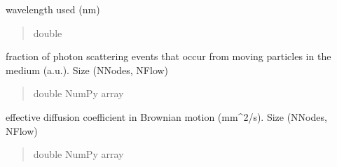 \documentclass[letterpaper,10pt,english]{sphinxmanual}
\begin{document}
\begin{fulllineitems}
\begin{fulllineitems}
\begin{quote}
\begin{description}
\end{description}\end{quote}

\end{fulllineitems}


\begin{fulllineitems}
\label{\detokenize{_autosummary/nirfasterff.base.dcs_mesh.dcsmesh:nirfasterff.base.dcs_mesh.dcsmesh.wv_DCS}}
\pysigstartsignatures
{}
\pysigstopsignatures
\sphinxAtStartPar
wavelength used (nm)
\begin{quote}\begin{description}
\sphinxAtStartPar
double

\end{description}\end{quote}

\end{fulllineitems}


\begin{fulllineitems}
\label{\detokenize{_autosummary/nirfasterff.base.dcs_mesh.dcsmesh:nirfasterff.base.dcs_mesh.dcsmesh.alpha}}
\pysigstartsignatures
{}
\pysigstopsignatures
\sphinxAtStartPar
fraction of photon scattering events that occur from moving particles in the medium (a.u.). Size (NNodes, NFlow)
\begin{quote}\begin{description}
\sphinxAtStartPar
double NumPy array

\end{description}\end{quote}

\end{fulllineitems}


\begin{fulllineitems}
\label{\detokenize{_autosummary/nirfasterff.base.dcs_mesh.dcsmesh:nirfasterff.base.dcs_mesh.dcsmesh.Db}}
\pysigstartsignatures
{}
\pysigstopsignatures
\sphinxAtStartPar
effective diffusion coefficient in Brownian motion (mm\textasciicircum{}2/s). Size (NNodes, NFlow)
\begin{quote}\begin{description}
\sphinxAtStartPar
double NumPy array


\end{description}
\end{quote}
\end{fulllineitems}
\end{fulllineitems}
\end{document}
